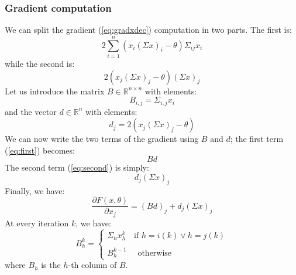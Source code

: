\subsubsection{Gradient computation}
We can split the gradient (\ref{eq:gradxdec}) computation in two parts. The first is:
\begin{equation}\label{eq:first}
2 \sum_{i=1}^n \left(x_i (\Sigma x)_i - \theta\right)\Sigma_{ij}x_i
\end{equation}
while the second is:
\begin{equation}\label{eq:second}
2(x_j (\Sigma x)_j - \theta)(\Sigma x)_j
\end{equation}
Let us introduce the matrix $B \in \mathbb{R}^{n \times n}$ with elements:
\begin{equation}
B_{i,j} = \Sigma_{i,j}  x_i 
\end{equation}
and the vector $d \in \mathbb{R}^n$ with elements:
\begin{equation}
d_j = 2 (x_j (\Sigma x)_j - \theta) 
\end{equation}
We can now write the two terms of the gradient using $B$ and $d$; the first term (\ref{eq:first}) becomes:
\begin{equation}
B d
\end{equation}
The second term (\ref{eq:second}) is simply:
\begin{equation}
d_j (\Sigma x)_j
\end{equation}
Finally, we have:
\begin{equation}\label{eq:newgradx}
\frac{\partial F(x,\theta)}{\partial x_j} =\left(B d\right)_j + d_j (\Sigma x)_j
\end{equation}
At every iteration $k$, we have:
\begin{equation}
B^{k}_{h} = \begin{cases}
		  		\Sigma_{h}x_h^{k} \quad \text{if } h = i(k) \vee h = j(k)\\\\
		  	    B^{k-1}_{h} \quad \text{     otherwise}
		  		\end{cases}
\end{equation}
where $B_{h}$ is the $h$-th column of $B$.